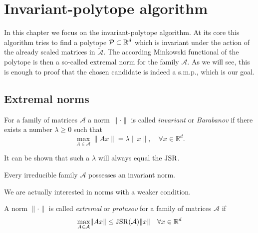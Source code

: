 
\chapter{Invariant-polytope algorithm}
\label{ch:inv.poly}	

In this chapter we focus on the invariant-polytope algorithm. 
At its core this algorithm tries to find a polytope $\mathcal{P} \subset \mathbb{R}^d $ which is invariant under the action of the already scaled matrices in $\tilde{\mathcal{A}}$. The according Minkowski functional of the polytope is then a so-called extremal norm for the family $\mathcal{A}$.
As we will see, this is enough to proof that the chosen candidate is indeed a s.m.p., which is our goal.

\section{Extremal norms}
\label{sec:extremal-norms}

\begin{definition}
    \citep{barabanov1988lyapunov}
    For a family of matrices $\mathcal{A}$ a norm $\lVert \cdot \rVert$ is called \emph{invariant} or \emph{Barabanov} if there exists a number $\lambda \geq 0$ such that
    $$\max\limits_{A \in \mathcal{A}}\lVert A x \rVert = \lambda \lVert x \rVert, \quad \forall x \in \mathbb{R}^d.$$
\end{definition}
    It can be shown that such a $\lambda$ will always equal the $\operatorname{JSR}$.

\begin{theorem}
    \citep{barabanov1988lyapunov} 
    Every irreducible family $\mathcal{A}$ possesses an invariant norm.
\end{theorem}

We are actually interested in norms with a weaker condition.

\begin{definition}
    \citep{protasov1996joint}
    A norm $\lVert \cdot \rVert$ is called \emph{extremal} or \emph{protasov} for a family of matrices $\mathcal{A}$ if 
    $$\max\limits_{A \in \mathcal{A}}\lVert A x \rVert \leq \operatorname{JSR}(\mathcal{A}) \lVert x \rVert \quad \forall x \in \mathbb{R}^d$$
\end{definition}

